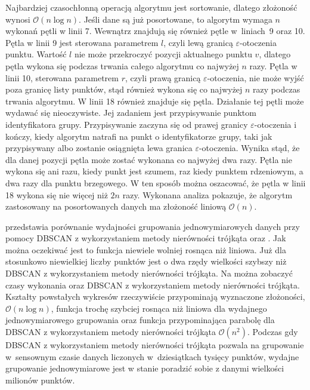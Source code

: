 Najbardziej czasochłonną operacją algorytmu jest sortowanie, dlatego złożoność wynosi $ \mathcal{O}(n\log{}n) $. Jeśli dane są już posortowane, to algorytm wymaga $ n $ wykonań pętli w linii 7. Wewnątrz znajdują się również pętle \mbox{w liniach 9} oraz 10. Pętla w linii 9 jest sterowana parametrem $ l $, czyli lewą granicą $ \varepsilon $-otoczenia punktu. Wartość $ l $ nie może przekroczyć pozycji aktualnego punktu $ v $, dlatego pętla wykona się podczas trwania całego algorytmu co najwyżej $ n $ razy. Pętla w linii 10, sterowana parametrem $ r $, czyli prawą granicą $ \varepsilon $-otoczenia, nie może wyjść poza granicę listy punktów, stąd również wykona się co najwyżej $ n $ razy podczas trwania algorytmu. W linii 18 również znajduje się pętla. Działanie tej pętli może wydawać się nieoczywiste. Jej zadaniem jest przypisywanie punktom identyfikatora grupy. Przypisywanie zaczyna się od prawej granicy $ \varepsilon $-otoczenia i kończy, kiedy algorytm natrafi na punkt o identyfikatorze grupy, taki jak przypisywany albo zostanie osiągnięta lewa granica $ \varepsilon $-otoczenia. Wynika stąd, że dla danej pozycji pętla może zostać wykonana co najwyżej dwa razy. Pętla nie wykona się ani razu, kiedy punkt jest szumem, raz kiedy punktem rdzeniowym, a dwa razy dla punktu brzegowego. W ten sposób można oszacować, że pętla w linii 18 wykona się nie więcej niż $ 2n $ razy. Wykonana analiza pokazuje, że algorytm zastosowany na posortowanych danych ma złożoność liniową $ \mathcal{O}(n). $\par



 przedstawia porównanie wydajności grupowania jednowymiarowych danych przy pomocy DBSCAN z wykorzystaniem metody nierówności trójkąta oraz . Jak można oczekiwać jest to funkcja niewiele wolniej rosnąca niż liniowa. Już dla stosunkowo niewielkiej liczby punktów  jest o dwa rzędy wielkości szybszy niż DBSCAN z wykorzystaniem metody nierówności trójkąta. Na  można zobaczyć czasy wykonania  oraz DBSCAN z wykorzystaniem metody nierówności trójkąta. Kształty powstałych wykresów rzeczywiście przypominają wyznaczone złożoności, $ \mathcal{O}(n\log{}n) $, funkcja trochę szybciej rosnąca niż liniowa dla wydajnego jednowymiarowego grupowania oraz funkcja przypominająca parabolę dla DBSCAN z wykorzystaniem metody nierówności trójkąta $ \mathcal{O}(n^2) $. Podczas gdy DBSCAN z wykorzystaniem metody nierówności trójkąta pozwala na grupowanie \mbox{w s}en\-sownym czasie danych liczonych \mbox{w d}ziesiątkach tysięcy punktów, wydajne grupowanie jednowymiarowe jest w stanie poradzić sobie z danymi wielkości milionów punktów.\par

